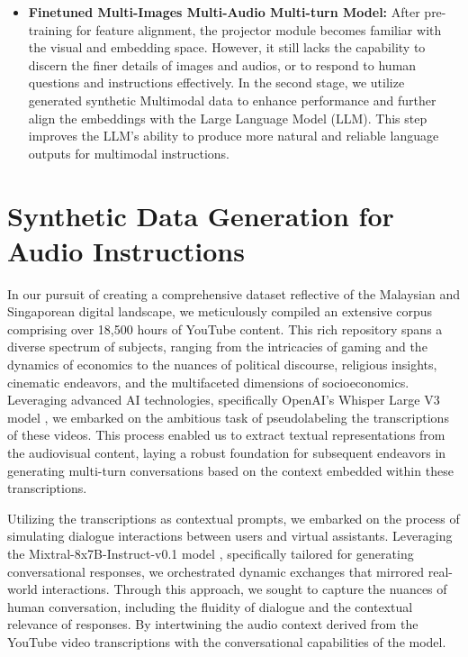 \documentclass[preprint]{article}
\begin{document}
\begin{itemize}
  \item \textbf{Finetuned Multi-Images Multi-Audio Multi-turn Model:} After pre-training for feature alignment, the projector module becomes familiar with the visual and embedding space. However, it still lacks the capability to discern the finer details of images and audios, or to respond to human questions and instructions effectively. In the second stage, we utilize generated synthetic Multimodal data to enhance performance and further align the embeddings with the Large Language Model (LLM). This step improves the LLM's ability to produce more natural and reliable language outputs for multimodal instructions.

\end{itemize}

\section{Synthetic Data Generation for Audio Instructions}\label{sec:synthetic-audio}

In our pursuit of creating a comprehensive dataset reflective of the Malaysian and Singaporean digital landscape, we meticulously compiled an extensive corpus comprising over 18,500 hours of YouTube content. This rich repository spans a diverse spectrum of subjects, ranging from the intricacies of gaming and the dynamics of economics to the nuances of political discourse, religious insights, cinematic endeavors, and the multifaceted dimensions of socioeconomics. Leveraging advanced AI technologies, specifically OpenAI's Whisper Large V3 model \cite{radford2022whisper}, we embarked on the ambitious task of pseudolabeling the transcriptions of these videos. This process enabled us to extract textual representations from the audiovisual content, laying a robust foundation for subsequent endeavors in generating multi-turn conversations based on the context embedded within these transcriptions.

Utilizing the transcriptions as contextual prompts, we embarked on the process of simulating dialogue interactions between users and virtual assistants. Leveraging the Mixtral-8x7B-Instruct-v0.1 model \cite{jiang2024mixtral}, specifically tailored for generating conversational responses, we orchestrated dynamic exchanges that mirrored real-world interactions. Through this approach, we sought to capture the nuances of human conversation, including the fluidity of dialogue and the contextual relevance of responses. By intertwining the audio context derived from the YouTube video transcriptions with the conversational capabilities of the model.
\end{document}
